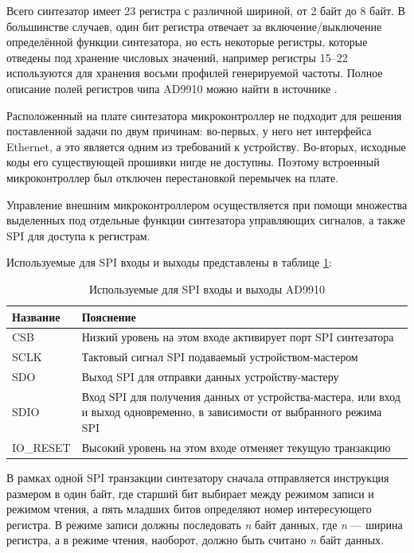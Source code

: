 \documentclass[rusmathsym, eqnumwithinsec, amspack, hyperref]{bomgost}
\begin{document}
Всего синтезатор имеет 23 регистра с различной шириной, от 2 байт до 8 байт. В большинстве случаев, один бит регистра отвечает за включение/выключение определённой функции синтезатора, но есть некоторые регистры, которые отведены под хранение числовых значений, например регистры 15--22 используются для хранения восьми профилей генерируемой частоты. Полное описание полей регистров чипа AD9910 можно найти в источнике \cite{AD9910Datasheet}.

Расположенный на плате синтезатора микроконтроллер не подходит для решения поставленной задачи по двум причинам: во-первых, у него нет интерфейса Ethernet, а это является одним из требований к устройству. Во-вторых, исходные коды его существующей прошивки нигде не доступны. Поэтому встроенный микроконтроллер был отключен перестановкой перемычек на плате.

Управление внешним микроконтроллером осуществляется при помощи множества выделенных под отдельные функции синтезатора управляющих сигналов, а также SPI для доступа к регистрам.

Используемые для SPI входы и выходы представлены в таблице \ref{tab:spi_pins}:

\begin{table}[H]
\centering
\caption{Используемые для SPI входы и выходы AD9910}
\label{tab:spi_pins}
\begin{tabular}{|p{4cm}|p{8cm}|}
\hline 
\textbf{Название} & \textbf{Пояснение} \\ 
\hline 
CSB & Низкий уровень на этом входе активирует порт SPI синтезатора \\ 
\hline
SCLK & Тактовый сигнал SPI подаваемый устройством-мастером \\
\hline
SDO & Выход SPI для отправки данных устройству-мастеру \\
\hline
SDIO & Вход SPI для получения данных от устройства-мастера, или вход и выход одновременно, в зависимости от выбранного режима SPI \\
\hline 
IO\_RESET & Высокий уровень на этом входе отменяет текущую транзакцию \\
\hline
\end{tabular} 
\end{table}

В рамках одной SPI транзакции синтезатору сначала отправляется инструкция размером в один байт, где старший бит выбирает между режимом записи и режимом чтения, а пять младших битов определяют номер интересующего регистра. В режиме записи должны последовать {\em n} байт данных, где {\em n} --- ширина регистра, а в режиме чтения, наоборот, должно быть считано {\em n} байт данных.
\end{document}
